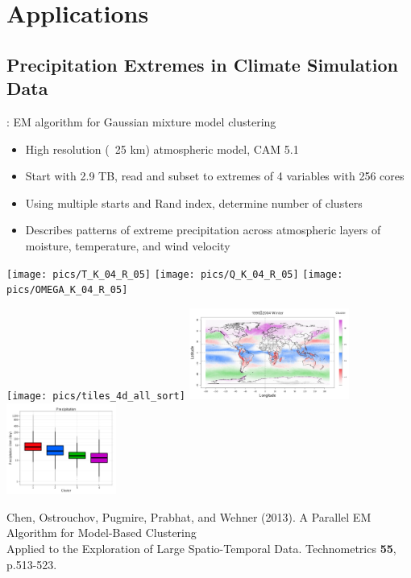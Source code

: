 \section{Applications}
\makesubcontentsslides

\subsection{Precipitation Extremes in Climate Simulation Data}
\begin{frame}
  \begin{block}{: EM algorithm for Gaussian mixture
      model clustering}
    \begin{minipage}{6cm}\scriptsize
      \begin{itemize}
      \item High resolution (~25 km) atmospheric model, CAM 5.1
      \item Start with 2.9 TB, read and subset to extremes of 4 variables with
        256 cores
      \item Using multiple starts and Rand index, determine number of clusters
      \item Describes patterns of extreme precipitation across
        atmospheric layers of moisture, temperature, and wind velocity
      \end{itemize}
    \end{minipage}
    \begin{minipage}{5.8cm}
      \texttt{[image: pics/T\_K\_04\_R\_05]}
      \texttt{[image: pics/Q\_K\_04\_R\_05]}
      \texttt{[image: pics/OMEGA\_K\_04\_R\_05]}
    \end{minipage}
    \vspace{-4.5ex}
    \begin{center}
      \texttt{[image: pics/tiles\_4d\_all\_sort]}
      \includegraphics[height=3cm]{pics/map_K_04_R_05}
      \includegraphics[trim=0mm 0mm 2mm 0mm,clip=true,height=3cm]{pics/PRECT_K_04_R_05}
    \end{center}
      \end{block}
\tiny Chen, Ostrouchov, Pugmire, Prabhat, and Wehner (2013). A
Parallel EM Algorithm for Model-Based Clustering \\[-2ex] Applied to the
Exploration of Large Spatio-Temporal Data. Technometrics {\bf 55}, p.513-523.
\end{frame}

